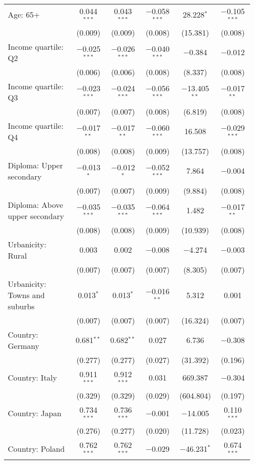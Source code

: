\begin{tabular}{@{\extracolsep{5pt}}lccccc}
  Age: 65+ & 0.044$^{***}$ & 0.043$^{***}$ & $-$0.058$^{***}$ & 28.228$^{*}$ & $-$0.105$^{***}$ \\ 
  & (0.009) & (0.009) & (0.008) & (15.381) & (0.008) \\ 
  Income quartile: Q2 & $-$0.025$^{***}$ & $-$0.026$^{***}$ & $-$0.040$^{***}$ & $-$0.384 & $-$0.012 \\ 
  & (0.006) & (0.006) & (0.008) & (8.337) & (0.008) \\ 
  Income quartile: Q3 & $-$0.023$^{***}$ & $-$0.024$^{***}$ & $-$0.056$^{***}$ & $-$13.405$^{**}$ & $-$0.017$^{**}$ \\ 
  & (0.007) & (0.007) & (0.008) & (6.819) & (0.008) \\ 
  Income quartile: Q4 & $-$0.017$^{**}$ & $-$0.017$^{**}$ & $-$0.060$^{***}$ & 16.508 & $-$0.029$^{***}$ \\ 
  & (0.008) & (0.008) & (0.009) & (13.757) & (0.008) \\ 
  Diploma: Upper secondary & $-$0.013$^{*}$ & $-$0.012$^{*}$ & $-$0.052$^{***}$ & 7.864 & $-$0.004 \\ 
  & (0.007) & (0.007) & (0.009) & (9.884) & (0.008) \\ 
  Diploma: Above upper secondary & $-$0.035$^{***}$ & $-$0.035$^{***}$ & $-$0.064$^{***}$ & 1.482 & $-$0.017$^{**}$ \\ 
  & (0.008) & (0.008) & (0.009) & (10.939) & (0.008) \\ 
  Urbanicity: Rural & 0.003 & 0.002 & $-$0.008 & $-$4.274 & $-$0.003 \\ 
  & (0.007) & (0.007) & (0.007) & (8.305) & (0.007) \\ 
  Urbanicity: Towns and suburbs & 0.013$^{*}$ & 0.013$^{*}$ & $-$0.016$^{**}$ & 5.312 & 0.001 \\ 
  & (0.007) & (0.007) & (0.007) & (16.324) & (0.007) \\ 
  Country: Germany & 0.681$^{**}$ & 0.682$^{**}$ & 0.027 & 6.736 & $-$0.308 \\ 
  & (0.277) & (0.277) & (0.027) & (31.392) & (0.196) \\ 
  Country: Italy & 0.911$^{***}$ & 0.912$^{***}$ & 0.031 & 669.387 & $-$0.304 \\ 
  & (0.329) & (0.329) & (0.029) & (604.804) & (0.197) \\ 
  Country: Japan & 0.734$^{***}$ & 0.736$^{***}$ & $-$0.001 & $-$14.005 & 0.110$^{***}$ \\ 
  & (0.276) & (0.277) & (0.020) & (11.728) & (0.023) \\ 
  Country: Poland & 0.762$^{***}$ & 0.762$^{***}$ & $-$0.029 & $-$46.231$^{*}$ & 0.674$^{***}$ \\ 

\end{tabular}
